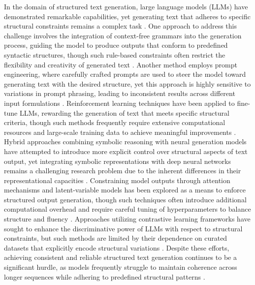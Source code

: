 In the domain of structured text generation, large language models (LLMs) have demonstrated remarkable capabilities, yet generating text that adheres to specific structural constraints remains a complex task \cite{satterfield2024fine,chen2024dynamic}. One approach to address this challenge involves the integration of context-free grammars into the generation process, guiding the model to produce outputs that conform to predefined syntactic structures, though such rule-based constraints often restrict the flexibility and creativity of generated text \cite{ilse2024comparative}. Another method employs prompt engineering, where carefully crafted prompts are used to steer the model toward generating text with the desired structure, yet this approach is highly sensitive to variations in prompt phrasing, leading to inconsistent results across different input formulations \cite{liu2024personalised,ashger2024contextual}. Reinforcement learning techniques have been applied to fine-tune LLMs, rewarding the generation of text that meets specific structural criteria, though such methods frequently require extensive computational resources and large-scale training data to achieve meaningful improvements \cite{mcintosh2024inadequacies}. Hybrid approaches combining symbolic reasoning with neural generation models have attempted to introduce more explicit control over structural aspects of text output, yet integrating symbolic representations with deep neural networks remains a challenging research problem due to the inherent differences in their representational capacities \cite{bennet2024new}. Constraining model outputs through attention mechanisms and latent-variable models has been explored as a means to enforce structured output generation, though such techniques often introduce additional computational overhead and require careful tuning of hyperparameters to balance structure and fluency \cite{kaleigha2024optimized}. Approaches utilizing contrastive learning frameworks have sought to enhance the discriminative power of LLMs with respect to structural constraints, but such methods are limited by their dependence on curated datasets that explicitly encode structural variations \cite{taillieu2024dynamic,nesbitt2024semantic}. Despite these efforts, achieving consistent and reliable structured text generation continues to be a significant hurdle, as models frequently struggle to maintain coherence across longer sequences while adhering to predefined structural patterns \cite{zollner2024technical}.

